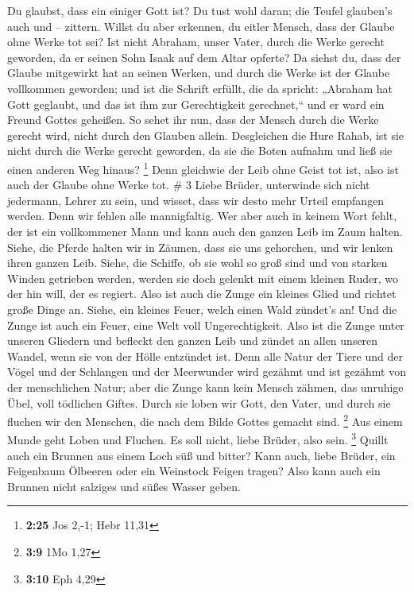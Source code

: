  Du glaubst, dass ein einiger Gott ist? Du tust wohl daran;
die Teufel glauben's auch und -- zittern.  Willst du aber
erkennen, du eitler Mensch, dass der Glaube ohne Werke tot sei?
 Ist nicht Abraham, unser Vater, durch die Werke gerecht
geworden, da er seinen Sohn Isaak auf dem Altar opferte? 
Da siehst du, dass der Glaube mitgewirkt hat an seinen Werken, und durch
die Werke ist der Glaube vollkommen geworden;  und ist die
Schrift erfüllt, die da spricht: „Abraham hat Gott geglaubt, und das ist
ihm zur Gerechtigkeit gerechnet,`` und er ward ein Freund Gottes
geheißen.  So sehet ihr nun, dass der Mensch durch die
Werke gerecht wird, nicht durch den Glauben allein. 
Desgleichen die Hure Rahab, ist sie nicht durch die Werke gerecht
geworden, da sie die Boten aufnahm und ließ sie einen anderen Weg
hinaus? \footnote{\textbf{2:25} Jos 2,-1; Hebr 11,31}  Denn
gleichwie der Leib ohne Geist tot ist, also ist auch der Glaube ohne
Werke tot. \# 3  Liebe Brüder, unterwinde sich nicht
jedermann, Lehrer zu sein, und wisset, dass wir desto mehr Urteil
empfangen werden.  Denn wir fehlen alle mannigfaltig. Wer
aber auch in keinem Wort fehlt, der ist ein vollkommener Mann und kann
auch den ganzen Leib im Zaum halten.  Siehe, die Pferde
halten wir in Zäumen, dass sie uns gehorchen, und wir lenken ihren
ganzen Leib.  Siehe, die Schiffe, ob sie wohl so groß sind
und von starken Winden getrieben werden, werden sie doch gelenkt mit
einem kleinen Ruder, wo der hin will, der es regiert.  Also
ist auch die Zunge ein kleines Glied und richtet große Dinge an. Siehe,
ein kleines Feuer, welch einen Wald zündet's an!  Und die
Zunge ist auch ein Feuer, eine Welt voll Ungerechtigkeit. Also ist die
Zunge unter unseren Gliedern und befleckt den ganzen Leib und zündet an
allen unseren Wandel, wenn sie von der Hölle entzündet ist. 
Denn alle Natur der Tiere und der Vögel und der Schlangen und der
Meerwunder wird gezähmt und ist gezähmt von der menschlichen Natur;
 aber die Zunge kann kein Mensch zähmen, das unruhige Übel,
voll tödlichen Giftes.  Durch sie loben wir Gott, den Vater,
und durch sie fluchen wir den Menschen, die nach dem Bilde Gottes
gemacht sind. \footnote{\textbf{3:9} 1Mo 1,27}  Aus einem
Munde geht Loben und Fluchen. Es soll nicht, liebe Brüder, also sein.
\footnote{\textbf{3:10} Eph 4,29}  Quillt auch ein Brunnen
aus einem Loch süß und bitter?  Kann auch, liebe Brüder,
ein Feigenbaum Ölbeeren oder ein Weinstock Feigen tragen? Also kann auch
ein Brunnen nicht salziges und süßes Wasser geben.

